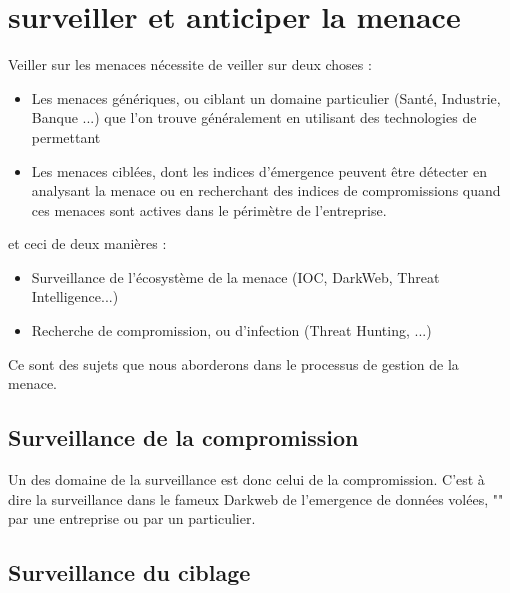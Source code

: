 
\section{surveiller et anticiper la menace}

Veiller sur les menaces nécessite de veiller sur deux choses : 

\begin{itemize}
  \item Les menaces génériques, ou ciblant un domaine  particulier (Santé, Industrie, Banque ...) que l'on trouve généralement en utilisant des technologies de  permettant 
  \item Les menaces ciblées, dont les indices d'émergence peuvent être détecter en analysant la menace ou  en recherchant des indices de compromissions quand ces menaces sont actives dans le périmètre de l'entreprise. 
\end{itemize}

et ceci de deux manières :

\begin{itemize}
  \item Surveillance de l'écosystème de la menace (IOC,  DarkWeb, Threat Intelligence...)
  \item Recherche de compromission, ou d'infection (Threat Hunting, ...) 
\end{itemize}

Ce sont des sujets que nous aborderons dans le processus de gestion de la menace.




\subsection{Surveillance de la compromission}

Un des domaine de la surveillance est donc celui de la compromission. C'est à dire la surveillance dans le fameux Darkweb de l'emergence de données volées, "" par une entreprise ou par un particulier.


\subsection{Surveillance du ciblage}

